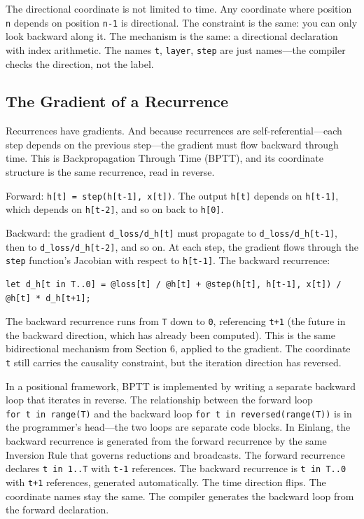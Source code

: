 \documentclass[11pt,titlepage]{article}
\begin{document}
The directional coordinate is not limited to time. Any coordinate where
position \texttt{n} depends on position \texttt{n-1} is directional. The
constraint is the same: you can only look backward along it. The
mechanism is the same: a directional declaration with index arithmetic.
The names \texttt{t}, \texttt{layer}, \texttt{step} are just names---the
compiler checks the direction, not the label.

\vspace{2em}

\hypertarget{the-gradient-of-a-recurrence}{%
\subsection{The Gradient of a
Recurrence}\label{the-gradient-of-a-recurrence}}

Recurrences have gradients. And because recurrences are
self-referential---each step depends on the previous step---the gradient
must flow backward through time. This is Backpropagation Through Time
(BPTT), and its coordinate structure is the same recurrence, read in
reverse.

Forward: \texttt{h{[}t{]}\ =\ step(h{[}t-1{]},\ x{[}t{]})}. The output
\texttt{h{[}t{]}} depends on \texttt{h{[}t-1{]}}, which depends on
\texttt{h{[}t-2{]}}, and so on back to \texttt{h{[}0{]}}.

Backward: the gradient \texttt{d\_loss/d\_h{[}t{]}} must propagate to
\texttt{d\_loss/d\_h{[}t-1{]}}, then to \texttt{d\_loss/d\_h{[}t-2{]}},
and so on. At each step, the gradient flows through the \texttt{step}
function's Jacobian with respect to \texttt{h{[}t-1{]}}. The backward
recurrence:

\begin{verbatim}
let d_h[t in T..0] = @loss[t] / @h[t] + @step(h[t], h[t-1], x[t]) / @h[t] * d_h[t+1];
\end{verbatim}

The backward recurrence runs from \texttt{T} down to \texttt{0},
referencing \texttt{t+1} (the future in the backward direction, which
has already been computed). This is the same bidirectional mechanism
from Section 6, applied to the gradient. The coordinate \texttt{t} still
carries the causality constraint, but the iteration direction has
reversed.

In a positional framework, BPTT is implemented by writing a separate
backward loop that iterates in reverse. The relationship between the
forward loop \texttt{for\ t\ in\ range(T)} and the backward loop
\texttt{for\ t\ in\ reversed(range(T))} is in the programmer's
head---the two loops are separate code blocks. In Einlang, the backward
recurrence is generated from the forward recurrence by the same
Inversion Rule that governs reductions and broadcasts. The forward
recurrence declares \texttt{t\ in\ 1..T} with \texttt{t-1} references.
The backward recurrence is \texttt{t\ in\ T..0} with \texttt{t+1}
references, generated automatically. The time direction flips. The
coordinate names stay the same. The compiler generates the backward loop
from the forward declaration.
\end{document}
